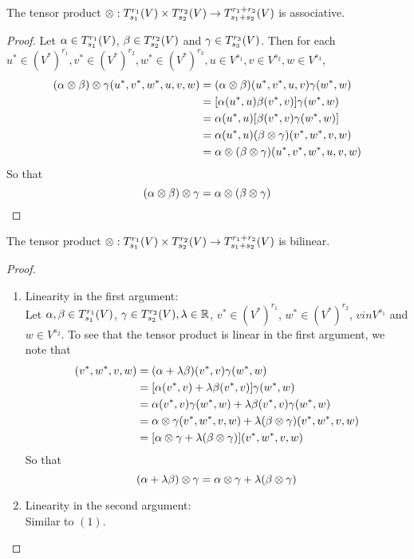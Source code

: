 \documentclass{book}
\begin{document}
	\begin{ex}
	The tensor product $\otimes : T^{r_{1}}_{s_{1}}(V) \times  T^{r_{2}}_{s_{2}}(V) \rightarrow T^{r_1 + r_2}_{s_1 + s_2}(V)$ is associative. 
	\end{ex}
	
	\begin{proof}
	Let $\alpha \in T^{r_{1}}_{s_{1}}(V)$, $\beta \in T^{r_{2}}_{s_{2}}(V)$ and $\gamma \in T^{r_{3}}_{s_{3}}(V)$. Then for each $u^* \in (V^*)^{r_1}, v^* \in (V^*)^{r_2}, w^* \in (V^*)^{r_3}, u \in V^{s_1}, v \in V^{s_2}, w \in V^{s_3}$,  
	\begin{align*}
	(\alpha \otimes \beta) \otimes \gamma (u^*, v^*, w^*, u, v, w) 
	&= (\alpha \otimes \beta) (u^*, v^*, u, v) \gamma (w^*, w) \\
	&= [\alpha(u^*, u) \beta(v^*, v)] \gamma(w^*, w) \\
	&= \alpha(u^*, u) [\beta(v^*, v) \gamma(w^*, w)] \\
	&= \alpha(u^*, u) (\beta \otimes \gamma) (v^*, w^*, v, w) \\
	&= \alpha \otimes (\beta \otimes \gamma)(u^*, v^*, w^*, u, v, w) 
	\end{align*}
	So that $$(\alpha \otimes \beta) \otimes \gamma = \alpha \otimes (\beta \otimes \gamma)$$
\end{proof}		
	
	\begin{ex}
	The tensor product $\otimes : T^{r_{1}}_{s_{1}}(V) \times  T^{r_{2}}_{s_{2}}(V) \rightarrow T^{r_1 + r_2}_{s_1 + s_2}(V)$ is bilinear. 
	\end{ex}
	
	\begin{proof}\
	\begin{enumerate}
	\item Linearity in the first argument:\\
	Let $\alpha, \beta \in T^{r_{1}}_{s_{1}}(V)$, $ \gamma \in T^{r_{2}}_{s_{2}}(V), \lambda \in \mathbb{R}$, $v^* \in (V^*)^{r_1}$, $w^* \in (V^*)^{r_2}$, $v in V^{s_1}$ and $w \in V^{s_2}$. To see that the tensor product is linear in the first argument, we note that  
	\begin{align*}
	[(\al + \lam \be) \otimes \gam] (v^*, w^*, v, w) 
	&= (\al + \lam \be)(v^*, v) \gam(w^*, w) \\
	&= [\al(v^*, v) + \lam \be (v^*, v)] \gam (w^*, w) \\
	&= \al(v^*, v) \gam (w^*, w) + \lam \be (v^*, v) \gam (w^*, w) \\
	&= \al \otimes \gam (v^*, w^*, v, w)  + \lam (\be \otimes \gam) (v^*, w^*, v, w) \\
	&= [\al \otimes \gam + \lam (\be \otimes \gam)] (v^*, w^*, v, w) 
	\end{align*}
	So that $$(\alpha + \lambda \beta) \otimes \gamma = \alpha \otimes \gamma + \lambda (\beta \otimes \gamma)$$
	\item Linearity in the second argument:\\
	Similar to $(1)$.
	\end{enumerate}
\end{proof}			
	
\end{document}
